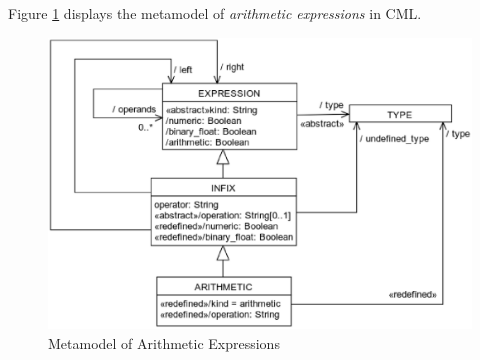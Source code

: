 Figure \ref{fig:meta:arithmetic} displays the metamodel of
\emph{arithmetic expressions} in CML.

\begin{figure}[H]
\centering
\includegraphics[width=1.0\textwidth]{metamodel/arithmetic}
\caption{Metamodel of Arithmetic Expressions}
\label{fig:meta:arithmetic}
\end{figure}
